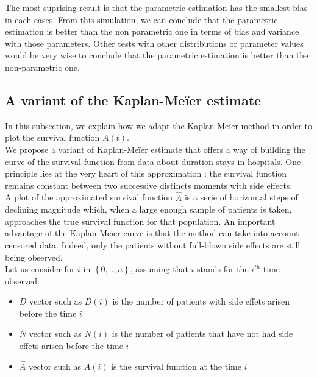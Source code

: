 \documentclass[12pt,twoside]{article}
\begin{document}
The most suprising result is that the parametric estimation has the smallest
bias in each cases. From this simulation, we can conclude that the parametric 
estimation is better than the non parametric one in terms of bias and variance with those parameters. Other tests with other distributions or parameter values would be very wise to conclude that the parametric estimation is better than the non-parametric one.

\subsection{A variant of the Kaplan-Meïer estimate}

In this subsection, we explain how we adapt the Kaplan-Meïer method in order to plot the survival function $A(t)$.\\

We propose a variant of Kaplan-Meïer estimate that offers a way of building the curve of the survival function from data about duration stays in hospitals. 
One principle lies at the very heart of this approximation : the survival function remains constant between two successive distincts moments with side effects.\\

A plot of the approximated survival function $\hat A $ is a serie of horizontal steps of declining magnitude which, when a large enough sample of patients is taken, approaches the true survival function for that population. An important advantage of the Kaplan-Meïer curve is that the method can take into account censored data. Indeed, only the patients without full-blown side effects are still being observed.\\

Let us consider for $i$ in  $\left\{ 0,..,n \right\}$, assuming that $i$ stands for the $i^{th}$ time observed:
\begin{itemize}
 	\item $D$ vector such as $D(i)$ is the number of patients with side effets arisen before the time $i$
   \item $N$ vector such as $N(i)$ is the number of patients that have not had 
side effets arisen before the time $i$
   \item $\hat A$ vector such as $\hat A(i)$ is the survival function at the time $i$
\end{itemize}
\end{document}

